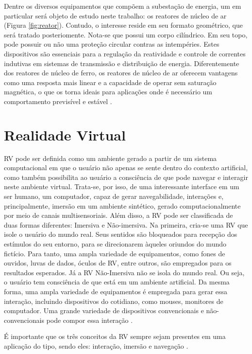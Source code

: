 Dentre os diversos equipamentos que compõem a subestação de energia, um em particular será objeto de estudo neste trabalho: os reatores de núcleo de ar (Figura \ref{fig:reator}). Contudo, o interesse reside em seu formato geométrico, que será tratado posteriomente. Nota-se que possui um corpo cilíndrico. Em seu topo, pode possuir ou não uma proteção circular contras as intempéries. Estes dispositivos são essenciais para a regulação da reatividade e controle de correntes indutivas em sistemas de transmissão e distribuição de energia. Diferentemente dos reatores de núcleo de ferro, os reatores de núcleo de ar oferecem vantagens como uma resposta mais linear e a capacidade de operar sem saturação magnética, o que os torna ideais para aplicações onde é necessário um comportamento previsível e estável \cite{de2012reatores}. 

\section{Realidade Virtual}
\label{sec:precisaorecall}

RV pode ser definida como um ambiente gerado a partir de um sistema computacional em que o usuário não apenas se sente dentro do contexto artificial, como também possibilita ao usuário a consciência de que pode navegar e interagir neste ambiente virtual. Trata-se, por isso, de uma interessante interface em um ser humano, um computador, capaz de gerar navegabilidade, interações e, principalmente, imersão em um ambiente sintético, gerado computacionalmente por meio de canais multisensoriais. Além disso, a RV pode ser classificada de duas formas diferentes: Imersiva e Não-imersiva. Na primeira, cria-se uma RV que isole o usuário do mundo real. Seus sentidos são bloqueados para recepção dos estímulos do seu entorno, para se direcionarem àqueles oriundos do mundo fictício. Para tanto, uma ampla variedade de equipamentos, como fones de ouvidos, luvas de dados, óculos de RV, entre outros, são empregados para os resultados esperados. Já a RV Não-Imersiva não se isola do mundo real. Ou seja, o usuário tem consciência de que está em um ambiente artificial. Da mesma forma, uma ampla variedade de equipamentos é empregada para gerar essa interação, incluindo dispositivos do cotidiano, como mouses, monitores de computador. Uma grande variedade de dispositivos convencionais e não-convencionais pode compor  essa interação \cite {cardoso2007tecnologias}.

É importante que os três conceitos da RV sempre sejam presentes em uma aplicação do tipo, sendo eles: interação, imersão e navegação \cite{kalawsky1993science}.

